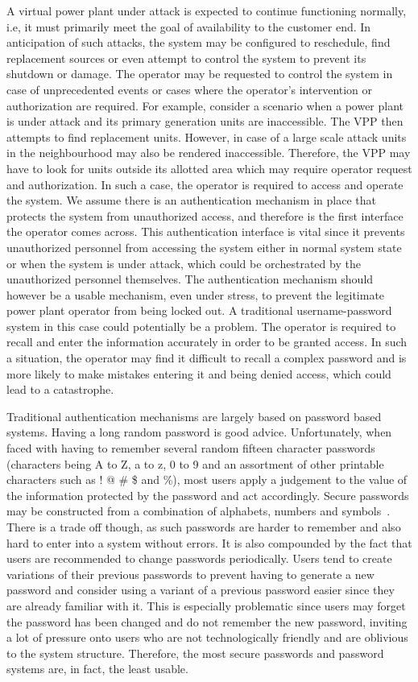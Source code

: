 A virtual power plant under attack is expected to continue functioning normally, i.e, it must primarily meet the goal of availability to the customer end. In anticipation of such attacks, the system may be configured to reschedule, find replacement sources or even attempt to control the system to prevent its shutdown or damage. The operator may be requested to control the system in case of unprecedented events or cases where the operator's intervention or authorization are required. For example, consider a scenario when a power plant is under attack and its primary generation units are inaccessible. The VPP then attempts to find replacement units. However, in case of a large scale attack units in the neighbourhood may also be rendered inaccessible. Therefore, the VPP may have to look for units outside its allotted area which may require operator request and authorization. In such a case, the operator is required to access and operate the system. We assume there is an authentication mechanism in place that protects the system from unauthorized access, and therefore is the first interface the operator comes across. This authentication interface is vital since it prevents unauthorized personnel from accessing the system either in normal system state or when the system is under attack, which could be orchestrated by the unauthorized personnel themselves. The authentication mechanism should however be a usable mechanism, even under stress, to prevent the legitimate power plant operator from being locked out. A traditional username-password system in this case could potentially be a problem. The operator is required to recall and enter the information accurately in order to be granted access. In such a situation, the operator may find it difficult to recall a complex password and is more likely to make mistakes entering it and being denied access, which could lead to a catastrophe. 

\smallskip

Traditional authentication mechanisms are largely based on password based systems. Having a long random password is good advice. Unfortunately, when faced with having to remember several random fifteen character passwords (characters being A to Z, a to z, 0 to 9 and an assortment of other printable characters such as ! @ \# \$ and \%), most users apply a judgement to the value of the information protected by the password and act accordingly. 
Secure passwords may be constructed from a combination of alphabets, numbers and symbols~\cite{adams1999users,verheul2007selecting}. There is a trade off though, as such passwords are harder to remember and also hard to enter into a system without errors. It is also compounded by the fact that users are recommended to change passwords periodically. Users tend to create variations of their previous passwords to prevent having to generate a new password and consider using a variant of a previous password easier since they are already familiar with it. This is especially problematic since users may forget the password has been changed and do not remember the new password, inviting a lot of pressure onto users who are not technologically friendly and are oblivious to the system structure. Therefore, the most secure passwords and password systems are, in fact, the least usable. 

